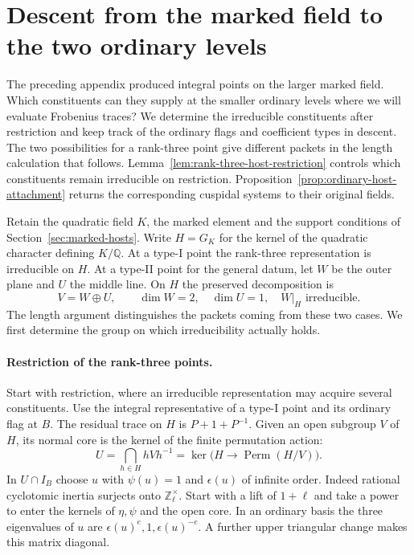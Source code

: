 \section{Descent from the marked field to the two ordinary levels}
\label{sec:host-descent}

The preceding appendix produced integral points on the larger marked field. Which
constituents can they supply at the smaller ordinary levels where we will evaluate
Frobenius traces? We determine the irreducible constituents
after restriction and keep track of the ordinary flags and
coefficient types in descent. The two possibilities for a
rank-three point give different packets in the length
calculation that follows. Lemma~\ref{lem:rank-three-host-restriction} controls which constituents remain irreducible on restriction. Proposition~\ref{prop:ordinary-host-attachment} returns the corresponding cuspidal systems to their original fields.

Retain the quadratic field \(K\), the marked element and the support conditions of Section~\ref{sec:marked-hosts}. Write \(H=G_K\) for the kernel of the quadratic character defining \(K/\mathbb Q\). At a type-I point the rank-three representation is irreducible on \(H\). At a type-II point for the general datum, let \(W\) be the outer plane and \(U\) the middle line. On \(H\) the preserved decomposition is
\[
 V=W\oplus U,\qquad \dim W=2,\quad\dim U=1,\quad W|_H\text{ irreducible}.
\] The length argument distinguishes the packets
coming from these two cases. We first determine the group on
which irreducibility actually holds.

\paragraph{Restriction of the rank-three points.}
Start with restriction, where an irreducible representation may acquire several
constituents. Use the integral representative of a type-I point and its
ordinary flag at \(B\). The residual trace on \(H\) is
\(P+1+P^{-1}\). Given an open subgroup \(V\) of \(H\), its normal core is the kernel of the finite permutation action:
\[
 U=\bigcap_{h\in H}hVh^{-1}=\ker\bigl(H\longrightarrow\operatorname{Perm}(H/V)\bigr).
\] In \(U\cap I_B\) choose \(u\)
with \(\psi(u)=1\) and \(\epsilon(u)\) of infinite order.
Indeed rational cyclotomic inertia surjects onto
\(\mathbb Z_\ell^\times\). Start with a lift of \(1+\ell\)
and take a power to enter the kernels of \(\eta,\psi\) and
the open core. In an ordinary basis the three eigenvalues
of \(u\) are \(\epsilon(u)^e,1,\epsilon(u)^{-e}\). A further
upper triangular change makes this matrix diagonal.

